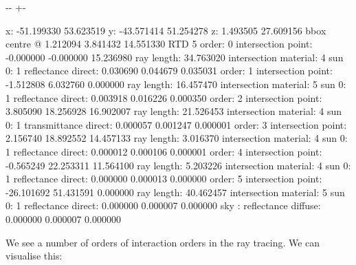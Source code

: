 \documentclass[letterpaper,10pt,english]{sphinxmanual}
\newlength\nbsphinxcodecellspacing
\begin{document}
{

\kern-\sphinxverbatimsmallskipamount\kern-\baselineskip
\kern+\FrameHeightAdjust\kern-\fboxrule
\vspace{\nbsphinxcodecellspacing}

\begin{sphinxVerbatim}[commandchars=\\\{\}]
x: -51.199330 53.623519
y: -43.571414 51.254278
z: 1.493505 27.609156
bbox centre @ 1.212094 3.841432 14.551330
RTD 5
order: 0        intersection point:     -0.000000 -0.000000 15.236980
                ray length:             34.763020
                intersection material:  4
                sun 0:                  1 reflectance
                direct:                 0.030690 0.044679 0.035031
order: 1        intersection point:     -1.512808 6.032760 0.000000
                ray length:             16.457470
                intersection material:  5
                sun 0:                  1 reflectance
                direct:                 0.003918 0.016226 0.000350
order: 2        intersection point:     3.805090 18.256928 16.902007
                ray length:             21.526453
                intersection material:  4
                sun 0:                  1 transmittance
                direct:                 0.000057 0.001247 0.000001
order: 3        intersection point:     2.156740 18.892552 14.457133
                ray length:             3.016370
                intersection material:  4
                sun 0:                  1 reflectance
                direct:                 0.000012 0.000106 0.000001
order: 4        intersection point:     -0.565249 22.253311 11.564100
                ray length:             5.203226
                intersection material:  4
                sun 0:                  1 reflectance
                direct:                 0.000000 0.000013 0.000000
order: 5        intersection point:     -26.101692 51.431591 0.000000
                ray length:             40.462457
                intersection material:  5
                sun 0:                  1 reflectance
                direct:                 0.000000 0.000007 0.000000
                sky  :                  reflectance
                diffuse:                0.000000 0.000007 0.000000
\end{sphinxVerbatim}
}

We see a number of orders of interaction orders in the ray tracing. We can visualise this:
\end{document}
